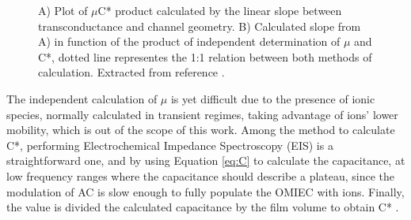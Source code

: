  \begin{figure}[h]
 	\centering
 	\hspace{2em}
 	\caption[OECTs benchmark with different OMIECs]{A) Plot of $\mu$C* product calculated by the linear slope between transconductance and channel geometry. B) Calculated slope from A) in function of the product of independent determination of $\mu$ and C*, dotted line representes the 1:1 relation between both methods of calculation. Extracted from reference %
 		\cite{inalBenchmarkingOrganicMixed2017}.}
 	\label{fig:gmuc}
 \end{figure}

The independent calculation of $\mu$ is yet difficult due to the presence of ionic species, normally calculated in transient regimes, taking advantage of ions' lower mobility, which is out of the scope of this work. Among the method to calculate C*, performing Electrochemical Impedance Spectroscopy (EIS) is a straightforward one, and by using Equation \ref{eq:C} to calculate the capacitance, at low frequency ranges where the capacitance should describe a plateau, since the modulation of AC is slow enough to fully populate the OMIEC with ions. Finally, the value is divided the calculated capacitance by the film volume to obtain C*%
 \cite{ohayonGuideCharacterizationOrganic2023}.

